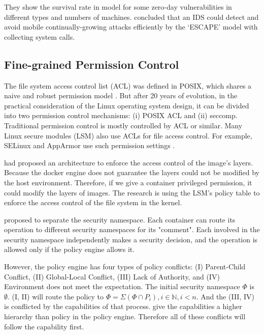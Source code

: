 They show the survival rate in \textcite{10.1007/978-3-319-24858-5_8} model for some
zero-day vulnerabilities in different types and numbers of machines.
\textcite{7809699,7796855} concluded that an IDS could detect and avoid mobile continually-growing
attacks efficiently by the `ESCAPE' model with collecting system calls.

\subsection{Fine-grained Permission Control}

The file system access control list (ACL) was defined in POSIX, which shares a naive and robust
permission model \cite{Grnbacher2003POSIXAC, 10.5555/3026877.3026930}. But after 20 years of
evolution, in the practical consideration of the Linux operating system design, it can be divided
into two permission control mechanisms: (\Rn{1}) POSIX ACL and (\Rn{2}) seccomp. Traditional
permission control is mostly controlled by ACL or similar. Many Linux secure modules (LSM) also
use ACLs for file access control\cite{Smalley2003ImplementingSA}. For example, SELinux and AppArmor
use such permission settings \cite{9184912, 217614, x11-SELinux, quteprints30563}.

\textcite{9184912} had proposed an architecture to enforce the access
control of the image's layers. Because the docker engine does not guarantee the layers could
not be modified by the host environment. Therefore, if we give a container privileged
permission, it could modify the layers of images. The research \cite{9184912} is using
the LSM's policy table to enforce the access control of the file system in the kernel.

\textcite{217614} proposed to separate the security namespace. Each container
can route its operation to different security namespaces for its "comment". Each
involved in the security namespace independently makes a security decision, and the
operation is allowed only if the policy engine allows it.

However, the policy engine has four types of policy conflicts: (\RN{1}) Parent-Child Conflict,
(\RN{2}) Global-Local Conflict, (\RN{3}) Lack of Authority, and  (\RN{4}) Environment does not
meet the expectation. The initial security namespace $\Phi$ is $\emptyset$. (\RN{1},
\RN{2}) will route the policy to $\Phi = \Sigma (\Phi \cap P_i), i \in \mathbb{N}, i < n$.
And the (\RN{3}, \RN{4}) is conflicted by the capabilities of that process. \textcite{217614}
give the capabilities a higher hierarchy than policy in the policy engine. Therefore
all of these conflicts will follow the capability first.

